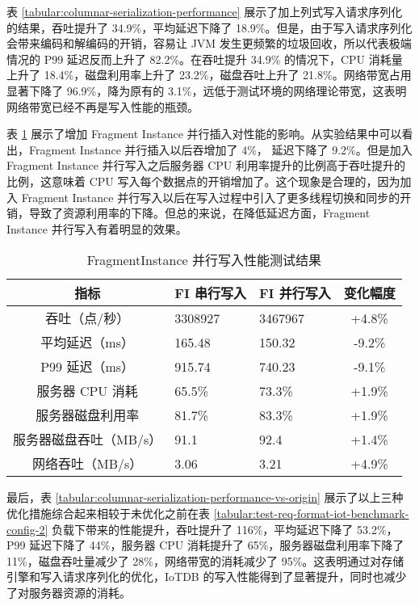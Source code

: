 表 \ref{tabular:columnar-serialization-performance} 展示了加上列式写入请求序列化的结果，吞吐提升了 34.9\%，平均延迟下降了 18.9\%。但是，由于写入请求序列化会带来编码和解编码的开销，容易让 JVM 发生更频繁的垃圾回收，所以代表极端情况的 P99 延迟反而上升了 82.2\%。在吞吐提升 34.9\% 的情况下，CPU 消耗量上升了 18.4\%，磁盘利用率上升了 23.2\%，磁盘吞吐上升了 21.8\%。网络带宽占用显著下降了 96.9\%，降为原有的 3.1\%，远低于测试环境的网络理论带宽，这表明网络带宽已经不再是写入性能的瓶颈。

表 \ref{tabular:fi-parallel-insert-performance} 展示了增加 Fragment Instance 并行插入对性能的影响。从实验结果中可以看出，Fragment Instance 并行插入以后吞增加了 $4\%$， 延迟下降了 $9.2\%$。但是加入 Fragment Instance 并行写入之后服务器 CPU 利用率提升的比例高于吞吐提升的比例，这意味着 CPU 写入每个数据点的开销增加了。这个现象是合理的，因为加入 Fragment Instance 并行写入以后在写入过程中引入了更多线程切换和同步的开销，导致了资源利用率的下降。但总的来说，在降低延迟方面，Fragment Instance 并行写入有着明显的效果。

\begin{table}
  \centering
  \caption{FragmentInstance 并行写入性能测试结果}
  \begin{tabular}{cp{3.5cm}p{3.5cm}c}
    \toprule 
    指标 &    FI 串行写入 &  FI 并行写入 & 变化幅度 \\
    \midrule  
    吞吐（点/秒） & 	3308927 & 3467967 & +4.8\%\\  
    平均延迟（ms） &  	165.48 & 150.32 & -9.2\%\\  
    P99 延迟（ms） & 	915.74 & 740.23 & -9.1\%\\  
    服务器 CPU 消耗 &  	65.5\% & 73.3\% & +1.9\%\\  
    服务器磁盘利用率 & 	81.7\% & 83.3\% & +1.9\%\\  
    服务器磁盘吞吐（MB/s） & 91.1 & 92.4 & +1.4\%\\  
    网络吞吐（MB/s） & 	3.06 & 3.21 & +4.9\%\\  
    \bottomrule
  \end{tabular}
  \label{tabular:fi-parallel-insert-performance}
\end{table}

最后，表 \ref{tabular:columnar-serialization-performance-vs-origin} 展示了以上三种优化措施综合起来相较于未优化之前在表 \ref{tabular:test-req-format-iot-benchmark-config-2} 负载下带来的性能提升，吞吐提升了 116\%，平均延迟下降了 53.2\%，P99 延迟下降了 44\%，服务器 CPU 消耗提升了 65\%，服务器磁盘利用率下降了 11\%，磁盘吞吐量减少了 28\%，网络带宽的消耗减少了 95\%。这表明通过对存储引擎和写入请求序列化的优化，IoTDB 的写入性能得到了显著提升，同时也减少了对服务器资源的消耗。

